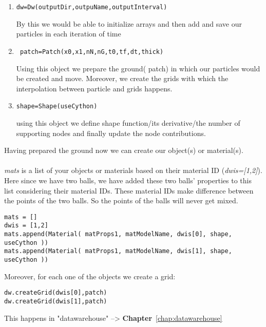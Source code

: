 \begin{enumerate}

\item \begin{lstlisting}
dw=Dw(outputDir,outpuName,outputInterval)                                   
\end{lstlisting}
By this we would be able to initialize arrays and then add and save our particles in each iteration of time

\item \begin{lstlisting}
 patch=Patch(x0,x1,nN,nG,t0,tf,dt,thick)   
\end{lstlisting}
Using this object we prepare the ground( patch) in which our particles would be created and move. Moreover, we create the grids with which the interpolation between particle and grids happens.
\item \begin{lstlisting}
shape=Shape(useCython)                                
\end{lstlisting}
using this object we define shape function/its derivative/the number of supporting nodes and finally update the node contributions. 

\end{enumerate}

Having prepared the ground now we can create our object(s) or material(s).\\ \\
\emph{mats} is a list of your objects or materials based on their material ID (\emph{dwis=[1,2]}). Here since we have two balls, we have added these two balls' properties to this list considering their material IDs. These material IDs make difference between the points of the two balls. So the points of the balls will never get mixed.
\begin{lstlisting}
mats = []    
dwis = [1,2]    
mats.append(Material( matProps1, matModelName, dwis[0], shape, useCython ))
mats.append(Material( matProps1, matModelName, dwis[1], shape, useCython ))
\end{lstlisting}

Moreover, for each one of the objects we create a grid:
\begin{lstlisting}
dw.createGrid(dwis[0],patch)
dw.createGrid(dwis[1],patch)
\end{lstlisting}
This happens in "datawarehouse" --> \textbf{Chapter}~\ref{chap:datawarehouse} \\ \\

